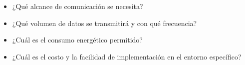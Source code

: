 \begin{itemize}
\begin{itemize}
        \begin{itemize}
            \item ¿Qué alcance de comunicación se necesita?
            \item ¿Qué volumen de datos se transmitirá y con qué frecuencia?
            \item ¿Cuál es el consumo energético permitido?
            \item ¿Cuál es el costo y la facilidad de implementación en el entorno específico?
        \end{itemize}

    \end{itemize}
\end{itemize}
